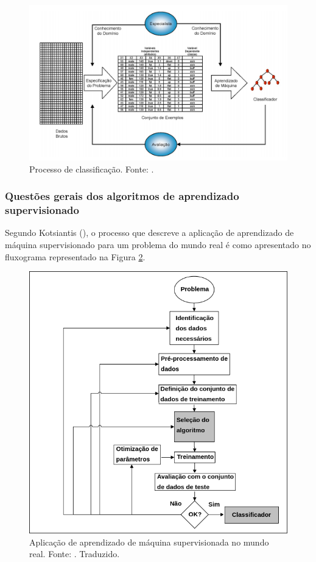 \begin{figure}[H]
    \centering
    \includegraphics[scale=0.3]{figuras/referencial_teorico/processo_classificacao.png}
    \caption[Processo de classificação]{Processo de classificação. Fonte: \cite{Monard:2003}.}
    \label{fig:processo_classificacao}
\end{figure}

\subsubsection{Questões gerais dos algoritmos de aprendizado supervisionado}
	
Segundo Kotsiantis (\citeyear{Kotsiantis}), o processo que descreve a aplicação de aprendizado de máquina supervisionado para um problema do mundo real é como apresentado no fluxograma representado na Figura \ref{fig:aplicacao_ml}.

\begin{figure}[H]
    \centering
    \includegraphics[scale=0.4]{figuras/referencial_teorico/aplicacao_ml.png}
    \caption[Aplicação de machine learning supervisionada no mundo real]{Aplicação de aprendizado de máquina supervisionada no mundo real. Fonte: \cite{Kotsiantis}. Traduzido.}
    \label{fig:aplicacao_ml}
\end{figure}

